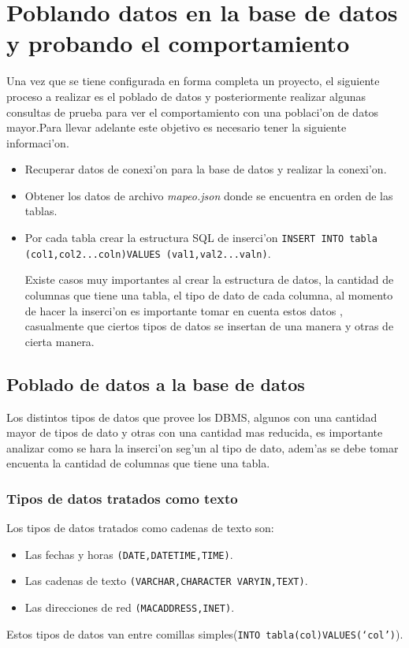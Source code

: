 \chapter{Poblando datos en la base de datos y probando el comportamiento}
Una vez que se tiene configurada en forma completa un proyecto, el siguiente proceso a realizar es el poblado de datos y posteriormente realizar algunas consultas de prueba para ver el comportamiento con una poblaci'on de datos mayor.Para llevar adelante este objetivo es necesario tener la siguiente informaci'on. 
\begin{itemize}
\item Recuperar datos de conexi'on para la base de datos y realizar la conexi'on.
\item Obtener los datos de archivo \textit{mapeo.json} donde se encuentra en orden de las tablas.
\item Por cada tabla crear la estructura SQL de inserci'on \texttt{INSERT INTO tabla (col1,col2...coln)VALUES (val1,val2...valn)}.

Existe casos muy importantes al crear la estructura de datos, la cantidad de columnas que tiene una tabla, el tipo de dato de cada columna, al momento de hacer la inserci'on es importante tomar en cuenta estos datos , casualmente que ciertos tipos de datos se insertan de una manera y  otras de cierta manera.   
\end{itemize} 
\section{Poblado de datos a la base de datos}
Los distintos tipos de datos que provee los DBMS, algunos con una cantidad mayor de tipos de dato y otras con una cantidad mas reducida, es importante analizar como se hara la inserci'on seg'un al tipo de dato, adem'as se debe tomar encuenta la cantidad de columnas que tiene una tabla.
\subsection{Tipos de datos tratados como texto}
Los tipos de datos tratados como cadenas de texto son:
\begin{itemize}
\item Las fechas y horas \texttt{(DATE,DATETIME,TIME)}.
\item Las cadenas de texto \texttt{(VARCHAR,CHARACTER VARYIN,TEXT)}.
\item Las direcciones de red \texttt{(MACADDRESS,INET)}.
\end{itemize}
Estos tipos de datos van entre comillas simples(\texttt{INTO tabla(col)VALUES(`col')}).
